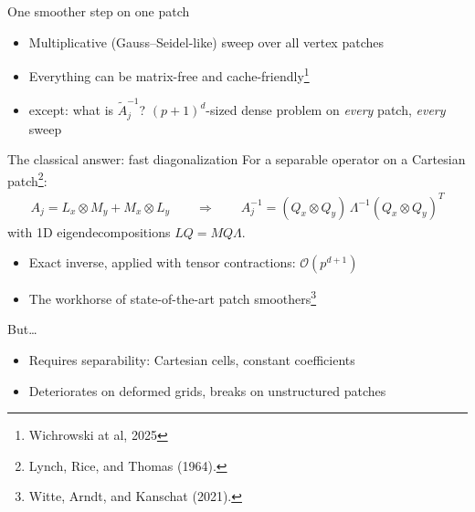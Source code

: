 \documentclass{beamer}
\begin{document}
\begin{frame}{One smoother step on one patch}
\begin{center}
{}
    \end{center}
    \vfill
    \begin{itemize}
        \item Multiplicative (Gauss--Seidel-like) sweep over all vertex patches
        \item Everything can be matrix-free and cache-friendly\footnote{Wichrowski at al, 2025}
        \item \alert{except:} what is $\tilde A_j^{-1}$? \quad
              $(p{+}1)^d$-sized dense problem on \emph{every} patch, \emph{every} sweep
    \end{itemize}
\end{frame}

\begin{frame}{The classical answer: fast diagonalization}
    For a \alert{separable} operator on a \alert{Cartesian} patch\footnote{Lynch, Rice, and Thomas (1964).}:
    \begin{gather*}
        A_j = L_x \otimes M_y + M_x \otimes L_y
        \qquad\Longrightarrow\qquad
        A_j^{-1} = (Q_x \otimes Q_y)\, \Lambda^{-1} (Q_x \otimes Q_y)^T
    \end{gather*}
    with 1D eigendecompositions $L Q = M Q \Lambda$.
    \begin{itemize}
        \item Exact inverse, applied with tensor contractions: $\mathcal O(p^{d+1})$
        \item The workhorse of state-of-the-art patch smoothers\footnote{Witte, Arndt, and Kanschat (2021).}
    \end{itemize}
    \vfill
    \pause
    \begin{alertblock}{But\dots}
        \begin{itemize}
            \item Requires separability: Cartesian cells, constant coefficients
            \item Deteriorates on deformed grids, breaks on unstructured patches
        \end{itemize}
    \end{alertblock}
    \vfill
    \centering
\end{frame}
\end{document}
